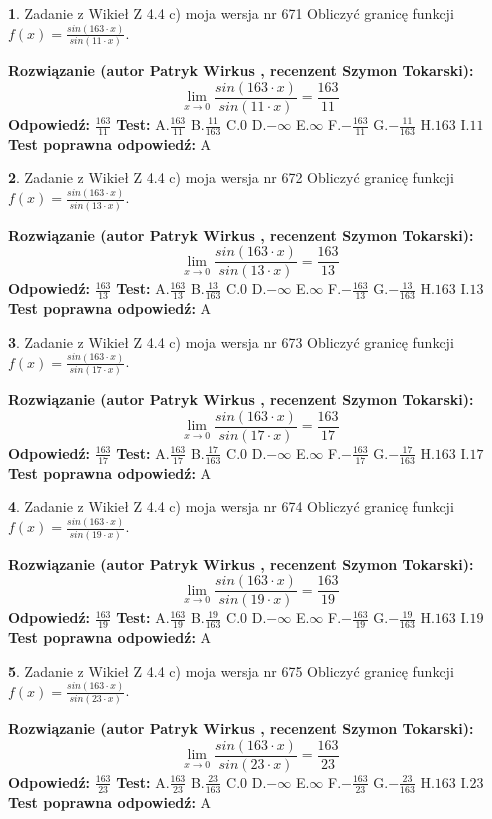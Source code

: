 \documentclass[12pt, a4paper]{article}
\theoremstyle{definition} %
\newtheorem{zad}{}
\newcommand{\zadStart}[1]{\begin{zad}#1\newline}
\newcommand{\zadStop}{\end{zad}}
\newcommand{\rozwStart}[2]{\noindent \textbf{Rozwiązanie (autor #1 , recenzent #2): }\newline}
\newcommand{\rozwStop}{\newline}
\newcommand{\odpStart}{\noindent \textbf{Odpowiedź:}\newline}
\newcommand{\odpStop}{\newline}
\newcommand{\testStart}{\noindent \textbf{Test:}\newline}
\newcommand{\testStop}{\newline}
\newcommand{\kluczStart}{\noindent \textbf{Test poprawna odpowiedź:}\newline}
\newcommand{\kluczStop}{\newline}
\begin{document}
\zadStart{Zadanie z Wikieł Z 4.4 c) moja wersja nr 671}
Obliczyć granicę funkcji $f(x)=\frac{sin(163\cdot x)}{sin(11\cdot x)}$.
\zadStop
\rozwStart{Patryk Wirkus}{Szymon Tokarski}
$$\lim\limits_{x\to 0}\frac{sin(163\cdot x)}{sin(11\cdot x)}=
\frac{163}{11}$$
\rozwStop
\odpStart
$\frac{163}{11}$
\odpStop
\testStart
A.$\frac{163}{11}$
B.$\frac{11}{163}$
C.$0$
D.$-\infty$
E.$\infty$
F.$-\frac{163}{11}$
G.$-\frac{11}{163}$
H.$163$
I.$11$
\testStop
\kluczStart
A
\kluczStop



\zadStart{Zadanie z Wikieł Z 4.4 c) moja wersja nr 672}
Obliczyć granicę funkcji $f(x)=\frac{sin(163\cdot x)}{sin(13\cdot x)}$.
\zadStop
\rozwStart{Patryk Wirkus}{Szymon Tokarski}
$$\lim\limits_{x\to 0}\frac{sin(163\cdot x)}{sin(13\cdot x)}=
\frac{163}{13}$$
\rozwStop
\odpStart
$\frac{163}{13}$
\odpStop
\testStart
A.$\frac{163}{13}$
B.$\frac{13}{163}$
C.$0$
D.$-\infty$
E.$\infty$
F.$-\frac{163}{13}$
G.$-\frac{13}{163}$
H.$163$
I.$13$
\testStop
\kluczStart
A
\kluczStop



\zadStart{Zadanie z Wikieł Z 4.4 c) moja wersja nr 673}
Obliczyć granicę funkcji $f(x)=\frac{sin(163\cdot x)}{sin(17\cdot x)}$.
\zadStop
\rozwStart{Patryk Wirkus}{Szymon Tokarski}
$$\lim\limits_{x\to 0}\frac{sin(163\cdot x)}{sin(17\cdot x)}=
\frac{163}{17}$$
\rozwStop
\odpStart
$\frac{163}{17}$
\odpStop
\testStart
A.$\frac{163}{17}$
B.$\frac{17}{163}$
C.$0$
D.$-\infty$
E.$\infty$
F.$-\frac{163}{17}$
G.$-\frac{17}{163}$
H.$163$
I.$17$
\testStop
\kluczStart
A
\kluczStop



\zadStart{Zadanie z Wikieł Z 4.4 c) moja wersja nr 674}
Obliczyć granicę funkcji $f(x)=\frac{sin(163\cdot x)}{sin(19\cdot x)}$.
\zadStop
\rozwStart{Patryk Wirkus}{Szymon Tokarski}
$$\lim\limits_{x\to 0}\frac{sin(163\cdot x)}{sin(19\cdot x)}=
\frac{163}{19}$$
\rozwStop
\odpStart
$\frac{163}{19}$
\odpStop
\testStart
A.$\frac{163}{19}$
B.$\frac{19}{163}$
C.$0$
D.$-\infty$
E.$\infty$
F.$-\frac{163}{19}$
G.$-\frac{19}{163}$
H.$163$
I.$19$
\testStop
\kluczStart
A
\kluczStop



\zadStart{Zadanie z Wikieł Z 4.4 c) moja wersja nr 675}
Obliczyć granicę funkcji $f(x)=\frac{sin(163\cdot x)}{sin(23\cdot x)}$.
\zadStop
\rozwStart{Patryk Wirkus}{Szymon Tokarski}
$$\lim\limits_{x\to 0}\frac{sin(163\cdot x)}{sin(23\cdot x)}=
\frac{163}{23}$$
\rozwStop
\odpStart
$\frac{163}{23}$
\odpStop
\testStart
A.$\frac{163}{23}$
B.$\frac{23}{163}$
C.$0$
D.$-\infty$
E.$\infty$
F.$-\frac{163}{23}$
G.$-\frac{23}{163}$
H.$163$
I.$23$
\testStop
\kluczStart
A
\kluczStop
\end{document}
